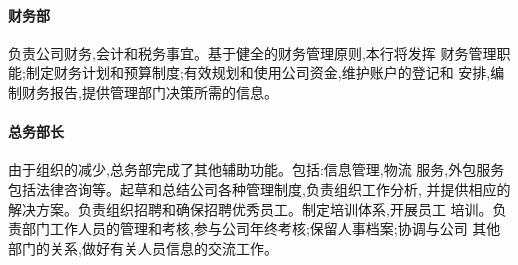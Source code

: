 \paragraph{财务部}
负责公司财务,会计和税务事宜。基于健全的财务管理原则,本行将发挥
财务管理职能;制定财务计划和预算制度;有效规划和使用公司资金,维护账户的登记和
安排,编制财务报告,提供管理部门决策所需的信息。

\paragraph{总务部长}
由于组织的减少,总务部完成了其他辅助功能。包括:信息管理,物流
服务,外包服务包括法律咨询等。起草和总结公司各种管理制度,负责组织工作分析,
并提供相应的解决方案。负责组织招聘和确保招聘优秀员工。制定培训体系,开展员工
培训。负责部门工作人员的管理和考核,参与公司年终考核;保留人事档案;协调与公司
其他部门的关系,做好有关人员信息的交流工作。


